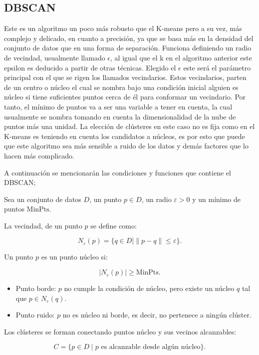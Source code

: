 \documentclass[12pt,a4paper]{article}
\begin{document}
\subsection{DBSCAN} 
Este es un algoritmo un poco más robusto que el K-means pero a su vez, más complejo 
y delicado, en cuanto a 
precisión, ya que se basa más en la densidad del conjunto de datos que en una forma
 de separación. Funciona definiendo un radio de vecindad,
usualmente llamado $\epsilon$, al igual que el k en el algoritmo anterior este epsilon 
es deducido a partir de
otras técnicas. Elegido el $\epsilon$ este será el parámetro principal con el que se 
rigen los llamados vecindarios.
Estos vecindarios, parten de un centro o núcleo el cual se nombra bajo una condición 
inicial alguien es núcleo si tiene suficientes puntos
cerca de él para conformar un vecindario. Por tanto, el mínimo de puntos va a ser una 
variable a tener en cuenta, 
la cual usualmente se nombra tomando en cuenta la dimensionalidad de la nube de 
puntos más una unidad. La elección de clústeres
en este caso no es fija como en el K-means es teniendo en cuenta los candidatos a 
núcleos, es por esto que puede que este algoritmo
sea más sensible a ruido de los datos y demás factores que lo hacen más complicado.

A continuación se mencionarán las condiciones y funciones que contiene el DBSCAN;

Sea un conjunto de datos $D$, un punto $p \in D$, un radio $\varepsilon > 0$ y un mínimo de puntos $\text{MinPts}$.


La vecindad, de un punto $p$ se define como:


\[
N_\varepsilon(p) = \{ q \in D \mid \|p - q\| \leq \varepsilon \}.
\]


Un punto $p$ es un punto núcleo si:


\[
|N_\varepsilon(p)| \geq \text{MinPts}.
\]

\begin{itemize}
\item{Punto borde: $p$ no cumple la condición de núcleo, pero existe un núcleo $q$ tal que $p \in N_\varepsilon(q)$.
}
\item{Punto ruido: $p$ no es núcleo ni borde, es decir, no pertenece a ningún clúster.
}
\end{itemize}

Los clústeres se forman conectando puntos núcleo y sus vecinos alcanzables:


\[
C = \{ p \in D \mid p \text{ es alcanzable desde algún núcleo} \}.
\]
\end{document}
